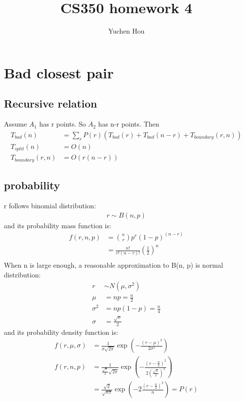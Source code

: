 \documentclass{article}
\begin{document}
\lstset{language=Java}
\title{CS350 homework 4}
\author{Yuchen Hou}
\maketitle

\section{Bad closest pair}
\subsection{Recursive relation}
Assume $A_1$ has r points. So $A_2$ has n-r points. Then
\begin{align*}
T_{bad}(n) &= \sum_r P(r) (T_{bad}(r) + T_{bad}(n-r) + T_{boundary}(r, n))\\
T_{split}(n) &= O(n)\\
T_{boundary}(r, n) &= O(r(n-r))
\end{align*}
\subsection{probability}
r follows binomial distribution:
\begin{align*}
r \sim B(n, p)
\end{align*}
and its probability mass function is:
\begin{align*}
f(r, n, p)
&= \binom{n}{r}p^r(1-p)^{(n-r)}\\
&=\frac{n!}{r!(n-r)!}(\frac{1}{2})^n\\
\end{align*}
When n is large enough, a reasonable approximation to B(n, p) is normal
distribution:
\begin{align*}
r &\sim N(\mu, \sigma^2)\\
\mu &= np = \frac{n}{2} \\
\sigma^2 &= np(1-p) = \frac{n}{4}\\
\sigma &= \frac{\sqrt{n}}{2}
\end{align*}
and its probability density function is:
\begin{align*}
f(r, \mu, \sigma)
&= \frac{1}{\sigma \sqrt{2\pi}}\exp(-\frac{(r-\mu)^2}{2\sigma^2})\\
f(r, n, p)
&= \frac{1}{\frac{\sqrt{n}}{2}
\sqrt{2\pi}}\exp(-\frac{(r-\frac{n}{2})^2}{2(\frac{\sqrt{n}}{2})^2})\\
&=\frac{\sqrt{2}}{\sqrt{n\pi}}\exp(-2\frac{(r-\frac{n}{2})^2}{n}) = P(r)
\end{align*}
\end{document}
